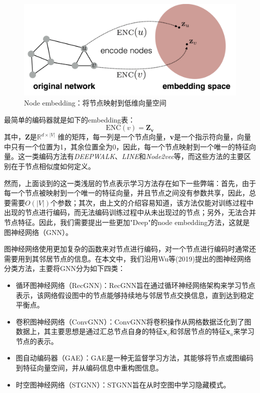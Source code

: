 \begin{figure}[!htbp]
  \centering
  \includegraphics[width=\textwidth]{Fig/nodeem.pdf}
  \caption{Node embedding：将节点映射到低维向量空间}
  \label{fig:nodeed}
\end{figure}

最简单的编码器就是如下的embedding表：
\[\text{ENC}(v) = \textbf{Z}_\textbf{v}\]
其中，$\textbf{Z}$是$\mathbb{R}^{d\times |V|}$ 维的矩阵，每一列是一个节点向量，\textbf{v}是一个指示符向量，向量中只有一个位置为1，其余位置全为0，因此，每一个节点映射到一个唯一的特征向量。这一类编码方法有\emph{DEEPWALK}\cite{perozzi2014deepwalk}、\emph{LINE}\cite{tang2015line}和\emph{Node2vec}\cite{grover2016node2vec}等，而这些方法的主要区别在于节点相似度如何定义。

然而，上面谈到的这一类浅层的节点表示学习方法存在如下一些弊端：首先，由于每一个节点被映射到一个唯一的特征向量，并且节点之间没有参数共享，因此，总要需要$O(|V|)$个参数；其次，由上文的介绍容易知道，该方法仅能对训练过程中出现的节点进行编码，而无法编码训练过程中从未出现过的节点；另外，无法合并节点特征。因此，我们需要提出一些更加"Deep"的node embedding方法，这就是图神经网络（GNN）。

图神经网络使用更加复杂的函数来对节点进行编码，对一个节点进行编码时通常还需要用到其邻居节点的信息。在本文中，我们沿用Wu等(2019)\cite{wu2019comprehensive}提出的图神经网络分类方法，主要将GNN分为如下四类：
\begin{itemize}
  \item 循环图神经网络（RecGNN)：RecGNN旨在通过循环神经网络架构来学习节点表示，该网络假设图中的节点能够持续地与邻居节点交换信息，直到达到稳定平衡点。
\item 卷积图神经网络（ConvGNN）：ConvGNN将卷积操作从网格数据泛化到了图数据上，其主要思想是通过汇总节点自身的特征\textbf{x}$_v$和邻居节点的特征\textbf{x}$_u$来学习节点的表示。
  \item 图自动编码器（GAE）：GAE是一种无监督学习方法，其能够将节点或图编码到特征向量空间，并从编码信息中重构图信息。
	\item 时空图神经网络（STGNN）：STGNN旨在从时空图中学习隐藏模式。
\end{itemize}

